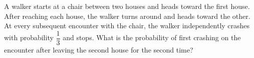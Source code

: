 A walker starts at a chair between two houses and heads toward the first house. After reaching each house, the walker turns around and heads toward the other. At every subsequent encounter with the chair, the walker independently crashes with probability $\dfrac{1}{3}$ and stops. What is the probability of first crashing on the encounter after leaving the second house for the second time?
